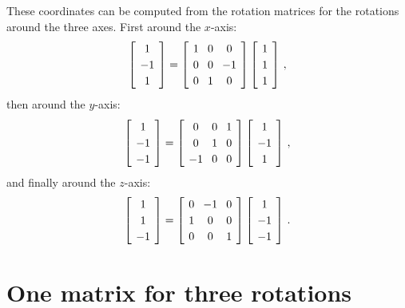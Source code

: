 \documentclass[11pt,a4paper]{report}
\newcommand*{\spacearray}{
\renewcommand{\arraystretch}{1.2}
\setlength{\arraycolsep}{4pt}
}
\begin{document}
These coordinates can be computed from the rotation matrices for the rotations around the three axes. First around the $x$-axis:
\[
\spacearray
\left[\begin{array}{c}1\\-1\\1\end{array}\right] =
\left[\begin{array}{ccc}1&0&0\\0&0&-1\\0&1&0\\\end{array}\right]
\left[\begin{array}{c}1\\1\\1\end{array}\right]\,,
\]
then around the $y$-axis:
\[
\spacearray
\left[\begin{array}{c}1\\-1\\-1\end{array}\right] =
\left[\begin{array}{ccc}0&0&1\\0&1&0\\-1&0&0\\\end{array}\right]
\left[\begin{array}{c}1\\-1\\1\end{array}\right]\,,
\]
and finally around the $z$-axis:
\[
\spacearray
\left[\begin{array}{c}1\\1\\-1\end{array}\right] =
\left[\begin{array}{ccc}0&-1&0\\1&0&0\\0&0&1\\\end{array}\right]
\left[\begin{array}{c}1\\-1\\-1\end{array}\right]\,.
\]


\section{One matrix for three rotations}
\end{document}
